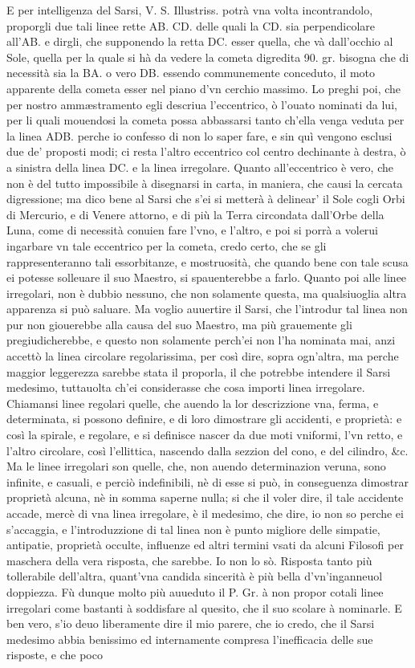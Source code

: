 \documentclass[11pt,twoside,openany]{book}
\begin{document}
E per intelligenza del Sarsi, V. S. Illustriss. potrà vna volta incontrandolo, proporgli due tali linee rette AB. CD. delle quali la CD. sia perpendicolare all'AB. e dirgli, che supponendo la retta DC. esser quella, che và dall'occhio al Sole, quella per la quale si hà da vedere la cometa digredita 90. gr. bisogna che di necessità sia la BA. o vero DB. essendo communemente conceduto, il moto apparente della cometa esser nel piano d'vn cerchio massimo. Lo preghi poi, che per nostro ammæstramento egli descriua l'eccentrico, ò l'ouato nominati da lui, per li quali mouendosi la cometa possa abbassarsi tanto ch'ella venga veduta per la linea ADB. perche io confesso di non lo saper fare, e sin quì vengono esclusi due de' proposti modi; ci resta l'altro eccentrico col centro dechinante à destra, ò a sinistra della linea DC. e la linea irregolare. Quanto all'eccentrico è vero, che non è del tutto impossibile à disegnarsi in carta, in maniera, che causi la cercata digressione; ma dico bene al Sarsi che s'ei si metterà à delinear' il Sole cogli Orbi di Mercurio, e di Venere attorno, e di più la Terra circondata dall'Orbe della Luna, come di necessità conuien fare l'vno, e l'altro, e poi si porrà a volerui ingarbare vn tale eccentrico per la cometa, credo certo, che se gli rappresenteranno tali essorbitanze, e mostruosità, che quando bene con tale scusa ei potesse solleuare il suo Maestro, si spauenterebbe a farlo. Quanto poi alle linee irregolari, non è dubbio nessuno, che non solamente questa, ma qualsiuoglia altra apparenza si può saluare. Ma voglio auuertire il Sarsi, che l'introdur tal linea non pur non giouerebbe alla causa del suo Maestro, ma più grauemente gli pregiudicherebbe, e questo non solamente perch'ei non l'ha nominata mai, anzi accettò la linea circolare regolarissima, per così dire, sopra ogn'altra, ma perche maggior leggerezza sarebbe stata il proporla, il che potrebbe intendere il Sarsi medesimo, tuttauolta ch'ei considerasse che cosa importi linea irregolare. Chiamansi linee regolari quelle, che auendo la lor descrizzione vna, ferma, e determinata, si possono definire, e di loro dimostrare gli accidenti, e proprietà: e così la spirale, e regolare, e si definisce nascer da due moti vniformi, l'vn retto, e l'altro circolare, così l'ellittica, nascendo dalla sezzion del cono, e del cilindro, \&c. Ma le linee irregolari son quelle, che, non auendo determinazion veruna, sono infinite, e casuali, e perciò indefinibili, nè di esse si può, in conseguenza dimostrar proprietà alcuna, nè in somma saperne nulla; si che il voler dire, il tale accidente accade, mercè di vna linea irregolare, è il medesimo, che dire, io non so perche ei s'accaggia, e l'introduzzione di tal linea non è punto migliore delle simpatie, antipatie, proprietà occulte, influenze ed altri termini vsati da alcuni Filosofi per maschera della vera risposta, che sarebbe. Io non lo sò. Risposta tanto più tollerabile dell'altra, quant'vna candida sincerità è più bella d'vn'inganneuol doppiezza. Fù dunque molto più auueduto il P. Gr. à non propor cotali linee irregolari come bastanti à soddisfare al quesito, che il suo scolare à nominarle. E ben vero, s'io deuo liberamente dire il mio parere, che io credo, che il Sarsi medesimo abbia benissimo ed internamente compresa l'inefficacia delle sue risposte, e che poco 
\end{document}
